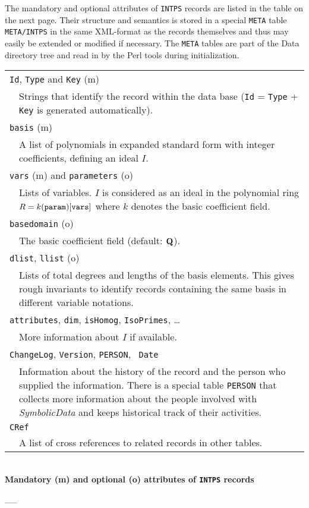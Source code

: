 \documentclass[11pt]{article}
\newcommand{\SD}{{\em Symbo\-lic\-Data}}
\begin{document}
The mandatory and optional attributes of {\tt INTPS} records are
listed in the table on the next page. Their structure and semantics is
stored in a special {\tt META} table {\tt META/INTPS} in the same
XML-format as the records themselves and thus may easily be extended
or modified if necessary. The {\tt META} tables are part of the Data
directory tree and read in by the Perl tools during initialization.

\begin{table}[ht]
\begin{center}
\begin{tabular}{p{8pt}p{11cm}}
\multicolumn{2}{l}{{\tt Id}, {\tt Type} and {\tt Key} (m)}\\ &
Strings that identify the record within the data base ({\tt Id} =
{\tt Type} + {\tt Key} is generated automatically).\\

\multicolumn{2}{l}{{\tt basis} (m)}\\ & A list of polynomials in
expanded standard form with integer coefficients, defining an
ideal $I$.\\

\multicolumn{2}{l}{{\tt vars} (m) and {\tt parameters} (o)}\\ &
Lists of variables. $I$ is considered as an ideal in the
polynomial ring $R=k({\tt param})[{\tt vars}]$ where $k$ denotes
the basic coefficient field.\\

\multicolumn{2}{l}{{\tt basedomain} (o)}\\ & The basic
coefficient field (default: ${\bf Q}$).\\

\multicolumn{2}{l}{{\tt dlist}, {\tt llist} (o)}\\ & Lists of
total degrees and lengths of the basis elements. This gives rough
invariants to identify records containing the same basis in
different variable notations. \\

\multicolumn{2}{l}{{\tt attributes}, {\tt dim}, {\tt isHomog},
{\tt IsoPrimes}, \ldots}\\ & More information about $I$ if
available.\\

\multicolumn{2}{l}{{\tt ChangeLog}, {\tt Version}, {\tt PERSON}, {\tt
Date}}\\ & Information about the history of the record and the person
who supplied the information. There is a special table {\tt PERSON}
that collects more information about the people involved with {\SD} and
keeps historical track of their activities. \\

\multicolumn{2}{l}{{\tt CRef}}\\ & A list of cross references to
related records in other tables.
\end{tabular}\\[12pt]
{\bf Mandatory (m) and optional (o) attributes of {\tt INTPS} records}
\end{center}
\_\hrulefill\_
\end{table}
\end{document}
